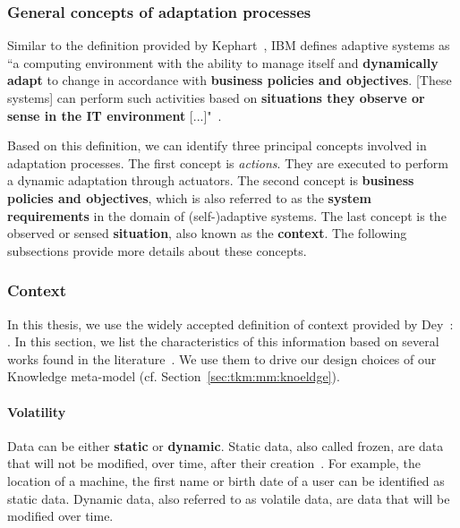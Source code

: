 \subsubsection{General concepts of adaptation processes}

Similar to the definition provided by Kephart~\cite{DBLP:journals/computer/KephartC03}, IBM  defines adaptive systems as ``a computing environment with the ability to manage itself and \textbf{dynamically adapt} to change in accordance with \textbf{business policies and objectives}. [These systems] can perform such activities based on \textbf{situations they observe or sense in the IT environment} [...]"~\cite{computing2006architectural}.

Based on this definition, we can identify three principal concepts involved in adaptation processes.
The first concept is \textit{actions}. 
They are executed to perform a dynamic adaptation through actuators.
The second concept is \textbf{business policies and objectives}, which is also referred to as the \textbf{system requirements} in the domain of (self-)adaptive systems.
The last concept is the observed or sensed \textbf{situation}, also known as the \textbf{context}.
The following subsections provide more details about these concepts.

\subsubsection{Context}

In this thesis, we use the widely accepted definition of context provided by \linebreak Dey~\cite{DBLP:journals/puc/Dey01}: .
In this section, we list the characteristics of this information based on several works found in the literature~\cite{DBLP:conf/pervasive/HenricksenIR02, DBLP:conf/seke/0001FNMKT14, DBLP:journals/percom/BettiniBHINRR10, DBLP:journals/comsur/PereraZCG14}.
We use them to drive our design choices of our Knowledge meta-model (cf. Section~\ref{sec:tkm:mm:knoeldge}).

\paragraph{Volatility}
Data can be either \textbf{static} or \textbf{dynamic}.
Static data, also called frozen, are data that will not be modified, over time, after their creation~\cite{DBLP:conf/pervasive/HenricksenIR02, DBLP:journals/comsur/MakrisSS13, DBLP:journals/percom/BettiniBHINRR10}.
For example, the location of a machine, the first name or birth date of a user can be identified as static data. 
Dynamic data, also referred to as volatile data, are data that will be modified over time.

